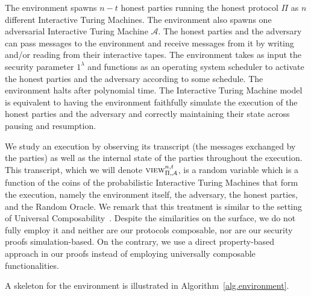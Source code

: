 The environment spawns $n - t$ honest parties running the honest protocol $\Pi$ as
$n$ different Interactive Turing Machines. The environment also spawns one
adversarial Interactive Turing Machine $\mathcal{A}$. The honest parties and the
adversary can pass messages to the environment and receive messages from it by
writing and/or reading from their interactive tapes. The environment takes as
input the security parameter $1^\lambda$ and functions as an operating system
scheduler to activate the honest parties and the adversary according to some
schedule. The environment halts after polynomial time. The Interactive Turing
Machine model is equivalent to having the environment faithfully simulate the
execution of the honest parties and the adversary and correctly maintaining
their state across pausing and resumption.

We study an execution by observing its transcript (the messages exchanged by the
parties) as well as the internal state of the parties throughout the execution.
This transcript, which we will denote $\textsc{view}_{\Pi,\mathcal{A}}^{n,t}$, is a
random variable which is a function of the coins of the probabilistic
Interactive Turing Machines that form the execution, namely the environment
itself, the adversary, the honest parties, and the Random Oracle. We remark that
this treatment is similar to the setting of Universal Composability~\cite{uc}.
Despite the similarities on the surface, we do not fully employ it and neither
are our protocols composable, nor are our security proofs simulation-based. On
the contrary, we use a direct property-based approach in our proofs instead of
employing universally composable functionalities.

A skeleton for the environment is illustrated in Algorithm~\ref{alg.environment}.



